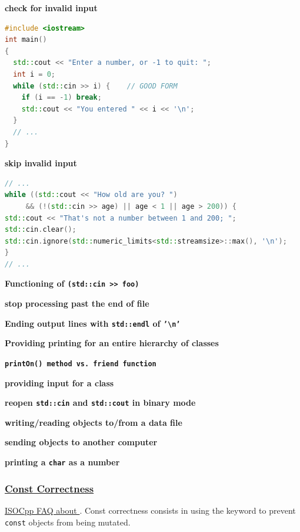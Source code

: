 \textbf{check for invalid input}
\begin{lstlisting}[language=C++]
#include <iostream>
int main()
{
  std::cout << "Enter a number, or -1 to quit: ";
  int i = 0;
  while (std::cin >> i) {    // GOOD FORM
    if (i == -1) break;
    std::cout << "You entered " << i << '\n';
  }
  // ...
}
\end{lstlisting}

\textbf{skip invalid input}
\begin{lstlisting}[language=C++]
// ...
while ((std::cout << "How old are you? ")
     && (!(std::cin >> age) || age < 1 || age > 200)) {
std::cout << "That's not a number between 1 and 200; ";
std::cin.clear();
std::cin.ignore(std::numeric_limits<std::streamsize>::max(), '\n');
}
// ...
\end{lstlisting}

\textbf{Functioning of \texttt{(std::cin >> foo)}}

\textbf{stop processing past the end of file}

\textbf{Ending output lines with \texttt{std::endl} of \texttt{'\textbackslash n'}}

\textbf{Providing printing for an entire hierarchy of classes}

\textbf{\texttt{printOn() method vs. \texttt{friend} function}}

\textbf{providing input for a class}

\textbf{reopen \texttt{std::cin} and \texttt{std::cout} in binary mode}

\textbf{writing/reading objects to/from a data file}

\textbf{sending objects to another computer}

\textbf{printing a \texttt{char} as a number}

\subsubsection{\href{https://isocpp.org/wiki/faq/const-correctness}{Const Correctness}}
\label{subsubsec:c++const-corr}
\href{https://isocpp.org/wiki/faq/const-correctness}{ISOCpp FAQ about }.
\newline
Const correctness consists in using the keyword  to 
prevent \texttt{const} objects from being mutated.

